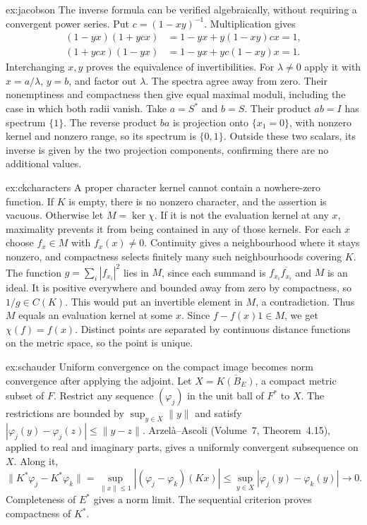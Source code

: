 \begin{solution}{ex:jacobson}
\idea The inverse formula can be verified algebraically, without requiring a convergent power series.
\writeup Put $c=(1-xy)^{-1}$. Multiplication gives
\[
\begin{aligned}
(1-yx)(1+ycx)&=1-yx+y(1-xy)cx=1,\\
(1+ycx)(1-yx)&=1-yx+yc(1-xy)x=1.
\end{aligned}
\]
Interchanging $x,y$ proves the equivalence of invertibilities. For $\lambda\ne0$ apply it with $x=a/\lambda$, $y=b$, and factor out $\lambda$. The spectra agree away from zero. Their nonemptiness and compactness then give equal maximal moduli, including the case in which both radii vanish.
Take $a=S^*$ and $b=S$. Their product $ab=I$ has spectrum $\{1\}$. The reverse product $ba$ is projection onto $\{x_1=0\}$, with nonzero kernel and nonzero range, so its spectrum is $\{0,1\}$. Outside these two scalars, its inverse is given by the two projection components, confirming there are no additional values.
\end{solution}

\begin{solution}{ex:ckcharacters}
\idea A proper character kernel cannot contain a nowhere-zero function.
\writeup If $K$ is empty, there is no nonzero character, and the assertion is vacuous. Otherwise let $M=\ker\chi$. If it is not the evaluation kernel at any $x$, maximality prevents it from being contained in any of those kernels. For each $x$ choose $f_x\in M$ with $f_x(x)\ne0$. Continuity gives a neighbourhood where it stays nonzero, and compactness selects finitely many such neighbourhoods covering $K$. The function $g=\sum_i|f_{x_i}|^2$ lies in $M$, since each summand is $f_{x_i}\overline{f_{x_i}}$ and $M$ is an ideal. It is positive everywhere and bounded away from zero by compactness, so $1/g\in C(K)$. This would put an invertible element in $M$, a contradiction.
Thus $M$ equals an evaluation kernel at some $x$. Since $f-f(x)1\in M$, we get $\chi(f)=f(x)$. Distinct points are separated by continuous distance functions on the metric space, so the point is unique.
\end{solution}

\begin{solution}{ex:schauder}
\idea Uniform convergence on the compact image becomes norm convergence after applying the adjoint.
\writeup Let $X=\overline{K(B_E)}$, a compact metric subset of $F$. Restrict any sequence $(\varphi_j)$ in the unit ball of $F^*$ to $X$. The restrictions are bounded by $\sup_{y\in X}\|y\|$ and satisfy $|\varphi_j(y)-\varphi_j(z)|\le\|y-z\|$. Arzel\`a--Ascoli (Volume~7, Theorem~4.15), applied to real and imaginary parts, gives a uniformly convergent subsequence on $X$. Along it,
\[
\|K^*\varphi_j-K^*\varphi_k\|
=\sup_{\|x\|\le1}|(\varphi_j-\varphi_k)(Kx)|
\le\sup_{y\in X}|\varphi_j(y)-\varphi_k(y)|\longrightarrow0.
\]
Completeness of $E^*$ gives a norm limit. The sequential criterion proves compactness of $K^*$.
\end{solution}

